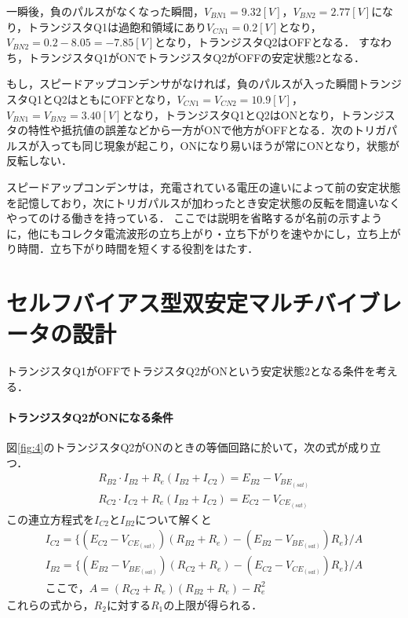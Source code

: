 \documentclass[10pt, a4j, dvipdfmx]{jarticle}
\begin{document}
    一瞬後，負のパルスがなくなった瞬間，$V_{BN1} = 9.32[V]$，$V_{BN2} = 2.77[V]$になり，トランジスタQ1は過飽和領域にあり$V_{CN1} = 0.2 [V]$となり，$V_{BN2} = 0.2 - 8.05 = -7.85[V]$となり，トランジスタQ2はOFFとなる．
    すなわち，トランジスタQ1がONでトランジスタQ2がOFFの安定状態2となる．

    もし，スピードアップコンデンサがなければ，負のパルスが入った瞬間トランジスタQ1とQ2はともにOFFとなり，$V_{CN1} = V_{CN2} = 10.9[V]$，$V_{BN1} = V_{BN2} = 3.40[V]$となり，トランジスタQ1とQ2はONとなり，トランジスタの特性や抵抗値の誤差などから一方がONで他方がOFFとなる．次のトリガパルスが入っても同じ現象が起こり，ONになり易いほうが常にONとなり，状態が反転しない．

    スピードアップコンデンサは，充電されている電圧の違いによって前の安定状態を記憶しており，次にトリガパルスが加わったとき安定状態の反転を間違いなくやってのける働きを持っている．
    ここでは説明を省略するが名前の示すように，他にもコレクタ電流波形の立ち上がり・立ち下がりを速やかにし，立ち上がり時間．立ち下がり時間を短くする役割をはたす．


    \newpage
    \section{セルフバイアス型双安定マルチバイブレータの設計}
    トランジスタQ1がOFFでトラジスタQ2がONという安定状態2となる条件を考える．

    \paragraph{トランジスタQ2がONになる条件}
    図\ref{fig:4}のトランジスタQ2がONのときの等価回路に於いて，次の式が成り立つ．
    \begin{eqnarray}
        R_{B2} \cdot I_{B2} + R_e (I_{B2} + I_{C2}) = E_{B2} - V_{BE_{(sat)}} \nonumber \\
        R_{C2} \cdot I_{C2} + R_e (I_{B2} + I_{C2}) = E_{C2} - V_{CE_{(sat)}} \nonumber
    \end{eqnarray}
    この連立方程式を$I_{C2}$と$I_{B2}$について解くと
    \begin{eqnarray}
        I_{C2} = \{(E_{C2} - V_{CE_{(sat)}})(R_{B2} + R_e) - (E_{B2} - V_{BE_{(sat)}}) R_e\} / A \nonumber \\
        I_{B2} = \{(E_{B2} - V_{BE_{(sat)}})(R_{C2} + R_e) - (E_{C2} - V_{CE_{(sat)}}) R_e\} / A \nonumber \\
        ここで， A = (R_{C2} + R_e)(R_{B2} + R_e) - R_e^2 \nonumber
    \end{eqnarray}
    これらの式から，$R_2$に対する$R_1$の上限が得られる．
\end{document}
